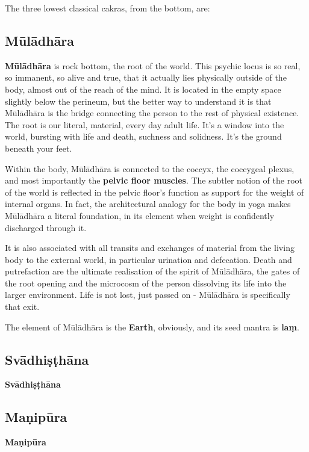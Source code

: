 \documentclass[a4paper,14pt]{memoir}
\newcommand{\muladhara}{Mūlādhāra}
\newcommand{\svadhisthana}{Svādhiṣṭhāna}
\newcommand{\manipura}{Maṇipūra}
\begin{document}
The three lowest classical cakras, from the bottom, are:

\subsection{\muladhara{}}

\textbf{\muladhara{}} is rock bottom, the root of the world. This psychic locus is so real, so immanent, so alive and true, that it actually lies physically outside of the body, almost out of the reach of the mind. It is located in the empty space slightly below the perineum, but the better way to understand it is that \muladhara{} is the bridge connecting the person to the rest of physical existence. The root is our literal, material, every day adult life. It's a window into the world, bursting with life and death, suchness and solidness. It's the ground beneath your feet.

Within the body, \muladhara{} is connected to the coccyx, the coccygeal plexus, and most importantly the \textbf{pelvic floor muscles}. The subtler notion of the root of the world is reflected in the pelvic floor's function as support for the weight of internal organs. In fact, the architectural analogy for the body in yoga makes \muladhara{} a literal foundation, in its element when weight is confidently discharged through it.

It is also associated with all transits and exchanges of material from the living body to the external world, in particular urination and defecation. Death and putrefaction are the ultimate realisation of the spirit of \muladhara{}, the gates of the root opening and the microcosm of the person dissolving its life into the larger environment. Life is not lost, just passed on - \muladhara{} is specifically that exit.

The element of \muladhara{} is the \textbf{Earth}, obviously, and its seed mantra is \textbf{laṃ}.

\subsection{\svadhisthana{}}

\textbf{\svadhisthana{}} 

\subsection{\manipura}

\textbf{\manipura}{}
\end{document}

